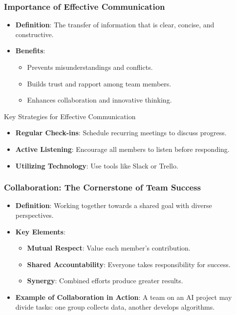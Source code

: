 \documentclass{beamer}
\begin{document}
\begin{frame}[fragile]
    \frametitle{Importance of Effective Communication}
    \begin{itemize}
        \item \textbf{Definition}: The transfer of information that is clear, concise, and constructive.
        \item \textbf{Benefits}:
        \begin{itemize}
            \item Prevents misunderstandings and conflicts.
            \item Builds trust and rapport among team members.
            \item Enhances collaboration and innovative thinking.
        \end{itemize}
    \end{itemize}
    \begin{block}{Key Strategies for Effective Communication}
        \begin{itemize}
            \item \textbf{Regular Check-ins}: Schedule recurring meetings to discuss progress.
            \item \textbf{Active Listening}: Encourage all members to listen before responding.
            \item \textbf{Utilizing Technology}: Use tools like Slack or Trello.
        \end{itemize}
    \end{block}
\end{frame}

\begin{frame}[fragile]
    \frametitle{Collaboration: The Cornerstone of Team Success}
    \begin{itemize}
        \item \textbf{Definition}: Working together towards a shared goal with diverse perspectives.
        \item \textbf{Key Elements}:
        \begin{itemize}
            \item \textbf{Mutual Respect}: Value each member's contribution.
            \item \textbf{Shared Accountability}: Everyone takes responsibility for success.
            \item \textbf{Synergy}: Combined efforts produce greater results.
        \end{itemize}
        \item \textbf{Example of Collaboration in Action}:
        A team on an AI project may divide tasks: one group collects data, another develops algorithms.
    \end{itemize}
\end{frame}
\end{document}
